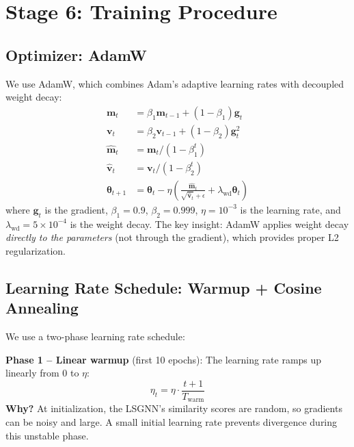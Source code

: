 \documentclass[conference]{IEEEtran}
\newcommand{\vect}[1]{\bm{#1}}
\begin{document}
\section{Stage 6: Training Procedure}
\label{sec:training}

\subsection{Optimizer: AdamW}

We use AdamW, which combines Adam's adaptive learning rates with decoupled weight decay:
\begin{align}
    \vect{m}_t &= \beta_1 \vect{m}_{t-1} + (1 - \beta_1) \vect{g}_t \\
    \vect{v}_t &= \beta_2 \vect{v}_{t-1} + (1 - \beta_2) \vect{g}_t^2 \\
    \hat{\vect{m}}_t &= \vect{m}_t / (1 - \beta_1^t) \\
    \hat{\vect{v}}_t &= \vect{v}_t / (1 - \beta_2^t) \\
    \bm{\theta}_{t+1} &= \bm{\theta}_t - \eta \left(\frac{\hat{\vect{m}}_t}{\sqrt{\hat{\vect{v}}_t} + \epsilon} + \lambda_{\text{wd}} \bm{\theta}_t\right)
\end{align}
where $\vect{g}_t$ is the gradient, $\beta_1 = 0.9$, $\beta_2 = 0.999$, $\eta = 10^{-3}$ is the learning rate, and $\lambda_{\text{wd}} = 5 \times 10^{-4}$ is the weight decay. The key insight: AdamW applies weight decay \emph{directly to the parameters} (not through the gradient), which provides proper L2 regularization.

\subsection{Learning Rate Schedule: Warmup + Cosine Annealing}

We use a two-phase learning rate schedule:

\textbf{Phase 1 -- Linear warmup} (first 10 epochs): The learning rate ramps up linearly from 0 to $\eta$:
\begin{equation}
    \eta_t = \eta \cdot \frac{t + 1}{T_{\text{warm}}}
\end{equation}
\textbf{Why?} At initialization, the LSGNN's similarity scores are random, so gradients can be noisy and large. A small initial learning rate prevents divergence during this unstable phase.
\end{document}
